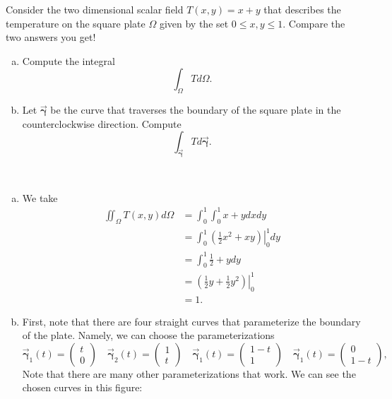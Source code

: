 \documentclass[12pt]{article} %
\newcommand{\curvegamma}{\boldsymbol{\vec{\gamma}}}
\begin{document}
\newpage
\begin{problem}
Consider the two dimensional scalar field $T(x,y)=x+y$ that describes the temperature on the square plate $\Omega$ given by the set $0\leq x,y \leq 1$.  Compare the two answers you get!
\begin{enumerate}[(a)]
	\item Compute the integral
	\[
	\int_\Omega T d\Omega.
	\]
	\item Let $\curvegamma$ be the curve that traverses the boundary of the square plate in the counterclockwise direction.  Compute
	\[
	\int_{\curvegamma} T d\curvegamma. 
	\]
\end{enumerate}
\end{problem}
\begin{solution} ~
	\begin{enumerate}[(a)]
		\item We take
		\begin{align*}
			\iint_\Omega T(x,y)d\Omega &= \int_0^1 \int_0^1 x+y dxdy\\
			&= \int_0^1 \left.\left(\frac{1}{2}x^2+xy\right)\right\vert_0^1 dy\\
			&= \int_0^1 \frac{1}{2} + y dy\\
			&= \left.\left(\frac{1}{2}y + \frac{1}{2}y^2\right)\right\vert_0^1\\
			&= 1.
		\end{align*}
		\item	First, note that there are four straight curves that parameterize the boundary of the plate.  Namely, we can choose the parameterizations 
		\[
		\curvegamma_1(t) = \begin{pmatrix} t \\ 0 \end{pmatrix} \quad \curvegamma_2(t) = \begin{pmatrix} 1 \\ t \end{pmatrix} \quad \curvegamma_1(t) = \begin{pmatrix} 1-t \\ 1 \end{pmatrix} \quad \curvegamma_1(t) = \begin{pmatrix} 0 \\ 1-t \end{pmatrix},
		\]
		Note that there are many other parameterizations that work. We can see the chosen curves in this figure:
		\begin{figure}[H]
			\centering

\end{figure}
\end{enumerate}
\end{solution}
\end{document}
